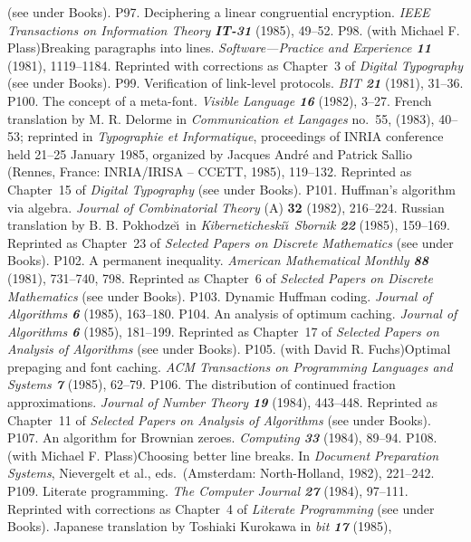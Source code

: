  (see under Books).
\p P97. Deciphering a linear congruential encryption. {\sl IEEE Transactions
 on Information Theory\/ \bf IT-31} (1985), 49--52.
\p P98. (with Michael F. Plass)\xskip Breaking paragraphs into lines.
 {\sl Software---Practice and Experience\/ \bf 11} (1981), 1119--1184. 
 Reprinted with corrections as Chapter~3 of {\sl Digital Typography\/}
 (see under Books).
\p P99. Verification of link-level protocols. {\sl BIT\/ \bf 21} (1981),
 31--36.
\p P100. The concept of a meta-font.  {\sl Visible Language\/ \bf 16} (1982),
 3--27. French translation by M. R. Delorme in
 {\sl Communication et Langages\/} no.~55, (1983), 40--53; reprinted in
 {\sl Typographie et Informatique}, proceedings of INRIA conference held
 21--25 January 1985, organized by Jacques Andr\'e and Patrick Sallio
 (Rennes, France: INRIA/IRISA -- CCETT, 1985), 119--132.
 Reprinted as Chapter~15 of {\sl Digital Typography\/} (see under Books).
\p P101. Huffman's algorithm via algebra. {\sl Journal of Combinatorial
 Theory\/} (A) {\bf 32} (1982), 216--224.
 Russian translation by B. B. Pokhodze\u\i\
 in {\sl Kiberneticheski\u\i\ Sbornik\/ \bf 22} (1985), 159--169.
 Reprinted as Chapter~23 of {\sl Selected Papers on
 Discrete Mathematics\/} (see under Books).
\p P102. A permanent inequality. {\sl American Mathematical Monthly\/ \bf 88}
 (1981), 731--740, 798.
 Reprinted as Chapter~6 of {\sl Selected Papers on
 Discrete Mathematics\/} (see under Books).
\p P103. Dynamic Huffman coding. {\sl Journal of Algorithms\/ \bf 6} (1985),
 163--180.
\p P104. An analysis of optimum caching. {\sl Journal of Algorithms\/ \bf 6}
 (1985), 181--199.
 Reprinted as Chapter~17 of {\sl Selected Papers on Analysis of Algorithms\/}
 (see under Books).
\p P105. (with David R. Fuchs)\xskip Optimal prepaging and font caching.
 {\sl ACM Transactions on Programming Languages and Systems\/
 \bf 7} (1985), 62--79.
\p P106. The distribution of continued fraction approximations. {\sl Journal
 of Number Theory\/ \bf 19} (1984), 443--448.
 Reprinted as Chapter~11 of {\sl Selected Papers on Analysis of Algorithms\/}
 (see under Books).
\p P107. An algorithm for Brownian zeroes. {\sl Computing\/ \bf 33} (1984),
 89--94.
\p *P108. (with Michael F. Plass)\xskip Choosing better line breaks.
 In {\sl Document Preparation Systems}, Nievergelt et al., eds.\ (Amsterdam:
 North-Holland, 1982), 221--242.
\p P109. Literate programming. {\sl The Computer Journal\/ \bf 27} (1984),
 97--111. Reprinted with corrections as Chapter~4 of {\sl Literate
 Programming\/} (see under Books).
 Japanese translation by Toshiaki Kurokawa in {\sl bit\/ \bf 17} (1985),
